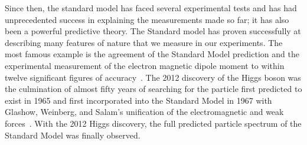 Since then, the standard model has faced several experimental tests and has had unprecedented success in explaining the measurements made so far; it has also been a powerful predictive theory. The Standard model has proven  successfully at describing many features of nature that we measure in our experiments. The most famous example is the agreement of the Standard Model prediction and the experimental measurement of the electron magnetic dipole moment to within twelve  significant figures of accuracy~\parencite{PhysRevLett.97.030801}.  The 2012 discovery of the Higgs boson was the culmination of almost fifty years of searching for the particle first predicted to exist in 1965 and first incorporated into the Standard Model in 1967 with Glashow, Weinberg, and Salam's unification of the electromagnetic and weak forces~\parencite{PhysRevLett.19.1264, gl1961579}. With the 2012 Higgs discovery, the full predicted particle spectrum of the Standard Model was finally observed.
